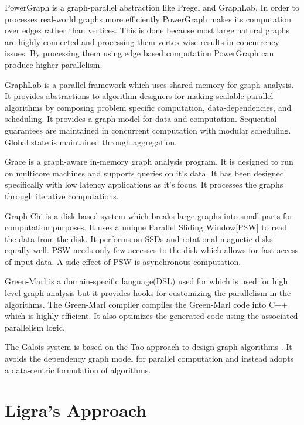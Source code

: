 \documentclass[a4paper,10pt,twoside]{article}
\begin{document}
	PowerGraph \cite{gonzalez2012powergraph} is a graph-parallel abstraction like Pregel and GraphLab. In order to processes real-world graphs more efficiently PowerGraph makes its computation over edges rather than vertices. This is done because most large natural graphs are highly connected and processing them vertex-wise results in concurrency issues. By processing them using edge based computation PowerGraph can produce higher parallelism.

	GraphLab \cite{low2010graphlab} is a parallel framework which uses shared-memory for graph analysis. It provides abstractions to algorithm designers for making scalable parallel algorithms by composing problem specific computation, data-dependencies, and scheduling. It provides a graph model for data and computation. Sequential guarantees are maintained in concurrent computation with modular scheduling. Global state is maintained through aggregation.

	Grace \cite{Prabhakaran:2012:MLG:2342821.2342825} is a graph-aware in-memory graph analysis program. It is designed to run on multicore machines and supports queries on it's data. It has been designed specifically with low latency applications as it's focus. It processes the graphs through iterative computations.

	Graph-Chi \cite{Kyrola:2012:GLG:2387880.2387884} is a disk-based system which breaks large graphs into small parts for computation purposes. It uses a unique Parallel Sliding Window[PSW] to read the data from the disk. It performs on SSDs and rotational magnetic disks equally well. PSW needs only few accesses to the disk which allows for fast access of input data. A side-effect of PSW is asynchronous computation. 

Green-Marl \cite{Hong:2012:GDE:2189750.2151013} is a domain-specific language(DSL) used for which is used for high level graph analysis but it provides hooks for customizing the parallelism in the algorithms. The Green-Marl compiler compiles the Green-Marl code into C++ which is highly efficient. It also optimizes the generated code using the associated parallelism logic. 

The Galois system is based on the Tao approach to design graph algorithms \cite{Pingali:2011:TPA:1993498.1993501}. It avoids the dependency graph model for parallel computation and instead adopts a data-centric formulation of algorithms.

\section{Ligra's Approach}
\end{document}
